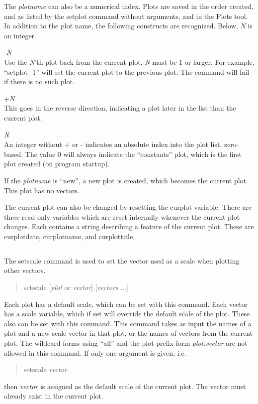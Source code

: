 The {\it plotname} can also be a numerical index.  Plots are saved in
the order created, and as listed by the {\cb setplot} command without
arguments, and in the {\cb Plots} tool.  In addition to the plot name,
the following constructs are recognized.  Below, {\it N} is an
integer.

\begin{description}
\item{\vt -}{\it N}\\
Use the {\it N\/}'th plot back from the current plot.  {\it N} must be
1 or larger.  For example, ``{\vt setplot -1}'' will set the current
plot to the previous plot.  The command will fail if there is no such
plot.

\item{\vt +}{\it N}\\
This goes in the reverse direction, indicating a plot later in the 
list than the current plot.

\item{\it N}\\
An integer without {\vt +} or {\vt -} indicates an absolute index into
the plot list, zero-based.  The value 0 will always indicate the
``constants'' plot, which is the first plot created (on program
startup).
\end{description}

If the {\it plotname} is ``{\vt new}'', a new plot is created, which
becomes the current plot.  This plot has no vectors.

The current plot can also be changed by resetting the {\et curplot}
variable.  There are three read-only variables which are reset
internally whenever the current plot changes.  Each contains a string
describing a feature of the current plot.  These are {\et
curplotdate}, {\et curplotname}, and {\et curplottitle}.

\subsection{}


The {\cb setscale} command is used to set the vector used as a scale
when plotting other vectors.
\begin{quote}\vt
setscale [{\it plot\/} or {\it vector\/}] [{\it vectors} ...]
\end{quote}
Each plot has a default scale, which can be set with this command. 
Each vector has a scale variable, which if set will override the
default scale of the plot.  These also can be set with this command. 
This command takes as input the names of a plot and a new scale vector
in that plot, or the names of vectors from the current plot.  The
wildcard forms using ``{\vt all}'' and the plot prefix form {\it
plot\/}.{\it vector} are not allowed in this command.  If only one
argument is given, i.e.
\begin{quote}
{\vt setscale} {\it vector}
\end{quote}
then {\it vector} is assigned as the default scale of the current plot.
The vector must already exist in the current plot.


